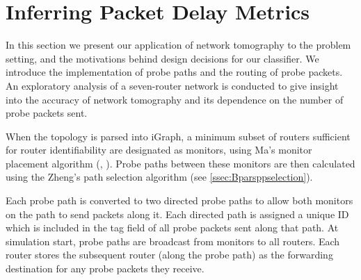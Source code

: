 \section{Inferring Packet Delay Metrics}
\label{sec:Mnetworkprobing}
In this section we present our application of network tomography to the problem setting, and the motivations behind design decisions for our classifier. We introduce the implementation of probe paths and the routing of probe packets. An exploratory analysis of a seven-router network is conducted to give insight into the accuracy of network tomography and its dependence on the number of probe packets sent.\par
When the topology is parsed into iGraph, a minimum subset of routers sufficient for router identifiability are designated as monitors, using Ma's monitor placement algorithm (\cite{ma_optimal_2015}, \cite{barnes_stochastic_2020}). Probe paths between these monitors are then calculated using the Zheng's path selection algorithm (see \cref{ssec:Bparsppselection}).\par
Each probe path is converted to two directed probe paths to allow both monitors on the path to send packets along it. Each directed path is assigned a unique ID which is included in the tag field of all probe packets sent along that path. At simulation start, probe paths are broadcast from monitors to all routers. Each router stores the subsequent router (along the probe path) as the forwarding destination for any probe packets they receive.\par
